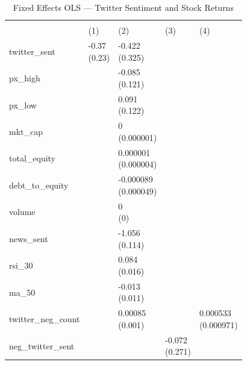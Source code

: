 \documentclass[12pt]{article}
\begin{document}
\begin{table}[htbp]
\centering
\caption{Fixed Effects OLS --- Twitter Sentiment and Stock Returns}
\label{tab:fe_main}
\begin{threeparttable}
\begingroup
\renewcommand\cellalign{t}
\renewcommand\arraystretch{1}
\setlength{\tabcolsep}{3pt}
\begin{tabularx}{\linewidth}{@{}>{\raggedright\arraybackslash}l>{\centering\arraybackslash}X>{\centering\arraybackslash}X>{\centering\arraybackslash}X>{\centering\arraybackslash}X}
\toprule
 & \multicolumn{4}{c}{return} \\
\cmidrule(lr){2-5}
 & (1) & (2) & (3) & (4) \\
\midrule
\addlinespace[1ex]
twitter\_sent & \makecell{-0.37 \\ (0.23)} & \makecell{-0.422 \\ (0.325)} &  &  \\
\addlinespace[0.5ex]
px\_high &  & \makecell{-0.085 \\ (0.121)} &  &  \\
\addlinespace[0.5ex]
px\_low &  & \makecell{0.091 \\ (0.122)} &  &  \\
\addlinespace[0.5ex]
mkt\_cap &  & \makecell{0 \\ (0.000001)} &  &  \\
\addlinespace[0.5ex]
total\_equity &  & \makecell{0.000001 \\ (0.000004)} &  &  \\
\addlinespace[0.5ex]
debt\_to\_equity &  & \makecell{-0.000089 \\ (0.000049)} &  &  \\
\addlinespace[0.5ex]
volume &  & \makecell{0 \\ (0)} &  &  \\
\addlinespace[0.5ex]
news\_sent &  & \makecell{-1.056 \\ (0.114)} &  &  \\
\addlinespace[0.5ex]
rsi\_30 &  & \makecell{0.084 \\ (0.016)} &  &  \\
\addlinespace[0.5ex]
ma\_50 &  & \makecell{-0.013 \\ (0.011)} &  &  \\
\addlinespace[0.5ex]
twitter\_neg\_count &  & \makecell{0.00085 \\ (0.001)} &  & \makecell{0.000533 \\ (0.000971)} \\
\addlinespace[0.5ex]
neg\_twitter\_sent &  &  & \makecell{-0.072 \\ (0.271)} &  \\

\end{tabularx}
\end{threeparttable}
\end{table}
\end{document}
